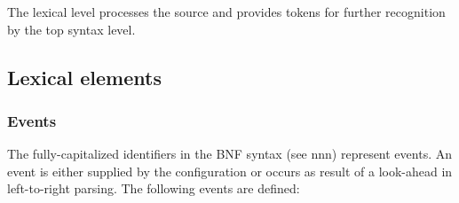 The lexical level processes the source and provides tokens for further
recognition by the top syntax level.

\subsection{Lexical elements}\label{lexical-elements}

\subsubsection{Events}\label{events}

The fully-capitalized identifiers in the BNF syntax (see nnn) represent
events. An event is either supplied by the configuration or occurs as
result of a look-ahead in left-to-right parsing. The following events
are defined:

